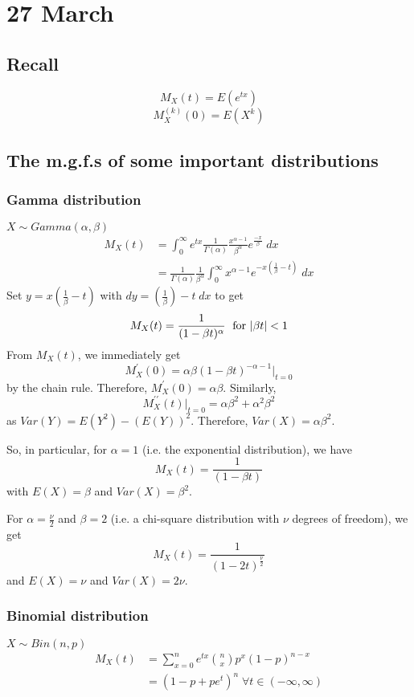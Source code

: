\documentclass[12pt]{article}
\begin{document}
\section{27 March}
\subsection{Recall}
\[
    M_X (t) = E(e^{tx})
\]
\[
    M_X^{(k)} (0) = E(X^k)
\]
\subsection{The m.g.f.s of some important distributions}
\subsubsection{Gamma distribution}
$X \sim Gamma(\alpha,\beta)$
\begin{align*}
    M_X (t) &= \int_0^{\infty} e^{tx} \frac{1}{\Gamma(\alpha)} \frac{x^{\alpha -1}}{\beta^{\alpha}} e^{\frac{-x}{\beta}} \; dx \\
        &= \frac{1}{\Gamma(\alpha)} \frac{1}{\beta^{\alpha}} \int_0^{\infty} x^{\alpha - 1} e^{-x ( \frac{1}{\beta} - t)} \; dx 
\end{align*}
Set $y = x(\frac{1}{\beta} - t)$ with $dy = (\frac{1}{\beta}) - t \; dx$ to get
\[
    M_X (t) = \frac{1}{(1-\beta t)^{\alpha}} \; \textnormal{ for } |\beta t| < 1 
\]
From $M_X (t)$, we immediately get
\[
    M_X^{\prime} (0) = \alpha \beta (1 - \beta t)^{-\alpha - 1} \Big|_{t=0}
\]
by the chain rule. Therefore, $M_X^{\prime} (0) = \alpha \beta$. Similarly,
\[
    M_X^{\prime \prime} (t) \Big|_{t=0} = \alpha \beta^2 + \alpha^2 \beta^2
\]
as $Var(Y) = E(Y^2) - (E(Y))^2$. Therefore, $Var(X) = \alpha \beta^2$.

So, in particular, for $\alpha = 1$ (i.e. the exponential distribution), we have
\[
    M_X (t) = \frac{1}{(1-\beta t)}
\]
with $E(X) = \beta$ and $Var(X) = \beta^2$. 

For $\alpha = \frac{\nu}{2}$ and $\beta = 2$ (i.e. a chi-square distribution with $\nu$ degrees of freedom), we get
\[
    M_X (t) = \frac{1}{(1-2t)^{\frac{\nu}{2}}}
\]
and $E(X) = \nu$ and $Var(X) = 2 \nu$.

\subsubsection{Binomial distribution}
$X \sim Bin(n,p)$
\begin{align*}
    M_X (t) &= \sum_{x=0}^n e^{tx} {n \choose x} p^x (1-p)^{n-x} \\
        &= (1 - p + pe^t)^n \; \forall t \in (-\infty, \infty)
\end{align*}
\end{document}
